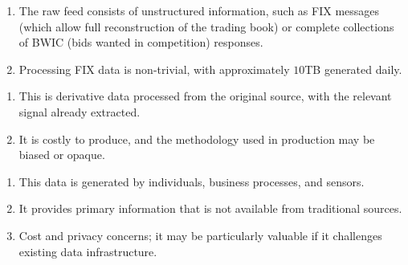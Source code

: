 \begin{remark} 
\begin{enumerate}[label=\roman*.]
\setlength{\itemsep}{0pt}
\item The raw feed consists of unstructured information, such as FIX messages (which allow full reconstruction of the trading book) or complete collections of BWIC (bids wanted in competition) responses.
\item Processing FIX data is non-trivial, with approximately $10$TB generated daily.
\end{enumerate}
\end{remark}

\begin{remark} 
\begin{enumerate}[label=\roman*.]
\setlength{\itemsep}{0pt}
\item This is derivative data processed from the original source, with the relevant signal already extracted.
\item It is costly to produce, and the methodology used in production may be biased or opaque.
\end{enumerate}
\end{remark}

\begin{remark} 
\begin{enumerate}[label=\roman*.]
\setlength{\itemsep}{0pt}
\item This data is generated by individuals, business processes, and sensors.
\item It provides primary information that is not available from traditional sources.
\item Cost and privacy concerns; it may be particularly valuable if it challenges existing data infrastructure.
\end{enumerate}
\end{remark}

